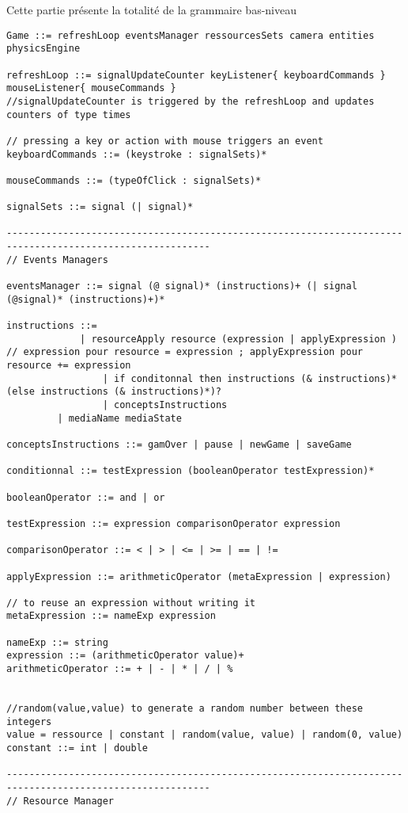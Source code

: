 Cette partie présente la totalité de la grammaire bas-niveau

\begin{lstlisting}[language=Grammar]
 Game ::= refreshLoop eventsManager ressourcesSets camera entities physicsEngine

refreshLoop ::= signalUpdateCounter keyListener{ keyboardCommands } mouseListener{ mouseCommands }
//signalUpdateCounter is triggered by the refreshLoop and updates counters of type times

// pressing a key or action with mouse triggers an event
keyboardCommands ::= (keystroke : signalSets)*

mouseCommands ::= (typeOfClick : signalSets)*

signalSets ::= signal (| signal)*

----------------------------------------------------------------------------------------------------------
// Events Managers

eventsManager ::= signal (@ signal)* (instructions)+ (| signal (@signal)* (instructions)+)*

instructions ::= 
	         | resourceApply resource (expression | applyExpression ) // expression pour resource = expression ; applyExpression pour resource += expression
                 | if conditonnal then instructions (& instructions)* (else instructions (& instructions)*)? 
                 | conceptsInstructions
		 | mediaName mediaState

conceptsInstructions ::= gamOver | pause | newGame | saveGame

conditionnal ::= testExpression (booleanOperator testExpression)*

booleanOperator ::= and | or

testExpression ::= expression comparisonOperator expression

comparisonOperator ::= < | > | <= | >= | == | !=

applyExpression ::= arithmeticOperator (metaExpression | expression)

// to reuse an expression without writing it
metaExpression ::= nameExp expression

nameExp ::= string
expression ::= (arithmeticOperator value)+
arithmeticOperator ::= + | - | * | / | %


//random(value,value) to generate a random number between these integers
value = ressource | constant | random(value, value) | random(0, value)
constant ::= int | double

----------------------------------------------------------------------------------------------------------
// Resource Manager


\end{lstlisting}
